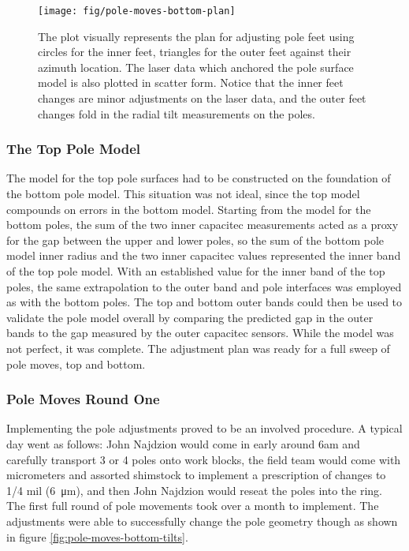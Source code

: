 \begin{figure}
\centering
\texttt{[image: fig/pole-moves-bottom-plan]}
\caption{
    The plot visually represents the plan for adjusting pole feet using circles for the inner feet, triangles for the outer feet against their azimuth location.  The laser data which anchored the pole surface model is also plotted in scatter form.  Notice that the inner feet changes are minor adjustments on the laser data, and the outer feet changes fold in the radial tilt measurements on the poles.
    \label{fig:pole-moves-bottom-plan}
}
\end{figure}

\subsubsection{The Top Pole Model}

The model for the top pole surfaces had to be constructed on the foundation of the bottom pole model.  This situation was not ideal, since the top model compounds on errors in the bottom model.  Starting from the model for the bottom poles, the sum of the two inner capacitec measurements acted as a proxy for the gap between the upper and lower poles, so the sum of the bottom pole model inner radius and the two inner capacitec values represented the inner band of the top pole model.  With an established value for the inner band of the top poles, the same extrapolation to the outer band and pole interfaces was employed as with the bottom poles.  The top and bottom outer bands could then be used to validate the pole model overall by comparing the predicted gap in the outer bands to the gap measured by the outer capacitec sensors.  While the model was not perfect, it was complete.  The adjustment plan was ready for a full sweep of pole moves, top and bottom.


\subsubsection{Pole Moves Round One}

Implementing the pole adjustments proved to be an involved procedure.  A typical day went as follows: John Najdzion would come in early around 6am and carefully transport 3 or 4 poles onto work blocks, the field team would come with micrometers and assorted shimstock to implement a prescription of changes to 1/4 mil (\SI{6}{\micro\meter}), and then John Najdzion would reseat the poles into the ring.  The first full round of pole movements took over a month to implement.  The adjustments were able to successfully change the pole geometry though as shown in figure \ref{fig:pole-moves-bottom-tilts}.

